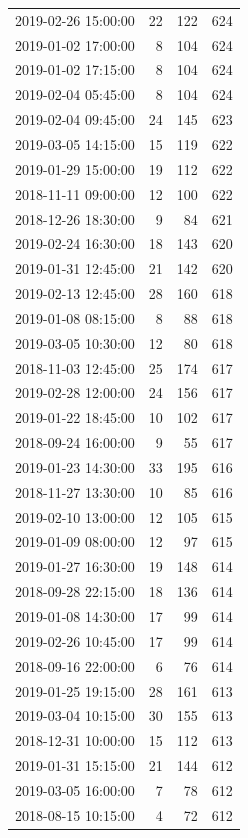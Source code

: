 \begin{tabular}{lrrr}
2019-02-26 15:00:00 & 22 & 122 & 624 \\
2019-01-02 17:00:00 & 8 & 104 & 624 \\
2019-01-02 17:15:00 & 8 & 104 & 624 \\
2019-02-04 05:45:00 & 8 & 104 & 624 \\
2019-02-04 09:45:00 & 24 & 145 & 623 \\
2019-03-05 14:15:00 & 15 & 119 & 622 \\
2019-01-29 15:00:00 & 19 & 112 & 622 \\
2018-11-11 09:00:00 & 12 & 100 & 622 \\
2018-12-26 18:30:00 & 9 & 84 & 621 \\
2019-02-24 16:30:00 & 18 & 143 & 620 \\
2019-01-31 12:45:00 & 21 & 142 & 620 \\
2019-02-13 12:45:00 & 28 & 160 & 618 \\
2019-01-08 08:15:00 & 8 & 88 & 618 \\
2019-03-05 10:30:00 & 12 & 80 & 618 \\
2018-11-03 12:45:00 & 25 & 174 & 617 \\
2019-02-28 12:00:00 & 24 & 156 & 617 \\
2019-01-22 18:45:00 & 10 & 102 & 617 \\
2018-09-24 16:00:00 & 9 & 55 & 617 \\
2019-01-23 14:30:00 & 33 & 195 & 616 \\
2018-11-27 13:30:00 & 10 & 85 & 616 \\
2019-02-10 13:00:00 & 12 & 105 & 615 \\
2019-01-09 08:00:00 & 12 & 97 & 615 \\
2019-01-27 16:30:00 & 19 & 148 & 614 \\
2018-09-28 22:15:00 & 18 & 136 & 614 \\
2019-01-08 14:30:00 & 17 & 99 & 614 \\
2019-02-26 10:45:00 & 17 & 99 & 614 \\
2018-09-16 22:00:00 & 6 & 76 & 614 \\
2019-01-25 19:15:00 & 28 & 161 & 613 \\
2019-03-04 10:15:00 & 30 & 155 & 613 \\
2018-12-31 10:00:00 & 15 & 112 & 613 \\
2019-01-31 15:15:00 & 21 & 144 & 612 \\
2019-03-05 16:00:00 & 7 & 78 & 612 \\
2018-08-15 10:15:00 & 4 & 72 & 612 \\

\end{tabular}
